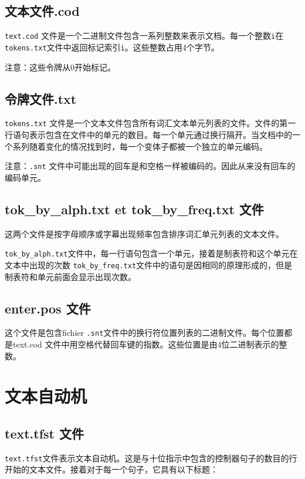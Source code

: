 \subsection{文本文件.cod}
\verb+text.cod+ 文件是一个二进制文件包含一系列整数来表示文档。每一个整数\verb+i+在\verb+tokens.txt+文件中返回标记索引\verb+i+。这些整数占用4个字节。

\bigskip
\noindent 
注意：这些令牌从0开始标记。



\subsection{令牌文件.txt}
\label{fichier-tokens-txt}
\verb+tokens.txt+ 文件是一个文本文件包含所有词汇文本单元列表的文件。文件的第一行语句表示包含在文件中的单元的数目。每一个单元通过换行隔开。当文档中的一个系列随着变化的情况找到时，每一个变体子都被一个独立的单元编码。


\bigskip
\noindent
注意：\verb+.snt+ 文件中可能出现的回车是和空格一样被编码的。因此从来没有回车的编码单元。


\subsection{ tok\_by\_alph.txt et tok\_by\_freq.txt 文件}
这两个文件是按字母顺序或字幕出现频率包含排序词汇单元列表的文本文件。

\bigskip
\noindent
 \verb+tok_by_alph.txt+文件中，每一行语句包含一个单元，接着是制表符和这个单元在文本中出现的次数
\bigskip
\noindent
\verb+tok_by_freq.txt+文件中的语句是因相同的原理形成的，但是制表符和单元前面会显示出现次数。




\subsection{ enter.pos 文件}
这个文件是包含fichier \verb+.snt+文件中的换行符位置列表的二进制文件。每个位置都是text.cod
文件中用空格代替回车键的指数。这些位置是由4位二进制表示的整数。




\section{文本自动机}

\subsection{ text.tfst 文件}
\label{section-tfst-format}
 \verb+text.tfst+文件表示文本自动机。这是与十位指示中包含的控制器句子的数目的行开始的文本文件。接着对于每一个句子，它具有以下标题：



